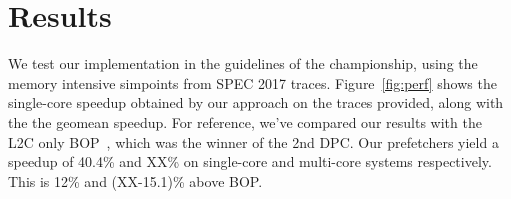 
\section{Results}
\label{Results}
We test our implementation in the guidelines of the championship, using the
memory intensive simpoints from SPEC 2017 traces. Figure~\ref{fig:perf} shows 
the single-core speedup obtained by our approach on the traces provided, 
along with the the geomean speedup. 
For reference, we've compared our results with the L2C only BOP~\cite{BOP}, 
which was the winner of the 2nd DPC. Our prefetchers yield a speedup of 40.4\% 
and XX\% on single-core and multi-core systems respectively. This is 12\% and 
(XX-15.1)\% above BOP.

